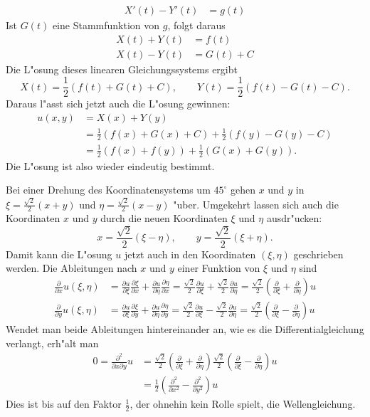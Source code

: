 \begin{loesung}
\begin{teilaufgaben}
\begin{align*}
X'(t)-Y'(t)&=g(t)
\end{align*}
Ist $G(t)$ eine Stammfunktion von $g$, folgt daraus
\begin{align*}
X(t)+Y(t)&=f(t)\\
X(t)-Y(t)&=G(t) + C
\end{align*}
Die L"osung dieses linearen Gleichungssystems ergibt
\[
X(t)=\frac12(f(t)+G(t)+C),\qquad 
Y(t)=\frac12(f(t)-G(t)-C).
\]
Daraus l"asst sich jetzt auch die L"osung gewinnen:
\begin{align*}
u(x,y)&=X(x)+Y(y)
\\
&=
\frac12(f(x)+G(x)+C)
+
\frac12(f(y)-G(y)-C)
\\
&=
\frac12(f(x)+f(y))+\frac12(G(x)+G(y)).
\end{align*}
Die L"osung ist also wieder eindeutig bestimmt.
\item
Bei einer Drehung des Koordinatensystems um $45^\circ$ gehen
$x$ und $y$ in $\xi=\frac{\sqrt{2}}2(x+y)$ und $\eta=\frac{\sqrt{2}}2(x-y)$
"uber. Umgekehrt lassen sich auch die Koordinaten $x$ und $y$ durch
die neuen Koordinaten $\xi$ und $\eta$ ausdr"ucken:
\[
x=\frac{\sqrt{2}}2(\xi-\eta),\qquad y=\frac{\sqrt{2}}2(\xi+\eta).
\]
Damit kann die L"osung $u$ jetzt auch in den Koordinaten $(\xi,\eta)$
geschrieben werden. Die Ableitungen nach $x$ und $y$
einer Funktion von $\xi$
und $\eta$ sind
\begin{align*}
\frac{\partial}{\partial x}u(\xi,\eta)
&=
\frac{\partial u}{\partial \xi}\frac{\partial \xi}{\partial x}
+
\frac{\partial u}{\partial \eta}\frac{\partial \eta}{\partial x}
=
\frac{\sqrt{2}}2\frac{\partial u}{\partial\xi}
+\frac{\sqrt{2}}2\frac{\partial u}{\partial\eta}
=
\frac{\sqrt{2}}2\left(\frac{\partial}{\partial \xi}+\frac{\partial}{\partial\eta}\right)u
\\
\frac{\partial}{\partial y}u(\xi,\eta)
&=
\frac{\partial u}{\partial \xi}\frac{\partial \xi}{\partial y}
+
\frac{\partial u}{\partial \eta}\frac{\partial \eta}{\partial y}
=
\frac{\sqrt{2}}2\frac{\partial u}{\partial\xi}
-\frac{\sqrt{2}}2\frac{\partial u}{\partial\eta}
=
\frac{\sqrt{2}}2\left(\frac{\partial}{\partial \xi}-\frac{\partial}{\partial\eta}\right)u
\end{align*}
Wendet man beide Ableitungen hintereinander an, wie es die
Differentialgleichung verlangt, erh"alt man
\begin{align*}
0=\frac{\partial^2}{\partial x\partial y}u
&=
\frac{\sqrt{2}}2
\left(\frac{\partial}{\partial \xi}+\frac{\partial}{\partial\eta}\right)
\frac{\sqrt{2}}2
\left(\frac{\partial}{\partial \xi}-\frac{\partial}{\partial\eta}\right)u
\\
&=
\frac12
\left(
\frac{\partial^2}{\partial x^2}-\frac{\partial^2}{\partial y^2}
\right)u
\end{align*}
Dies ist bis auf den Faktor $\frac12$, der ohnehin kein Rolle spielt,
die Wellengleichung.
\end{teilaufgaben}
\end{loesung}
